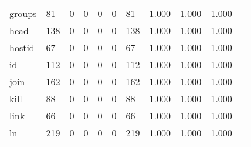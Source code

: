 \begin{longtable}{lp{1.10cm}p{1.10cm}p{1.10cm}p{1.10cm}p{1.10cm}p{1.10cm}p{1.10cm}p{1.10cm}p{1.10cm}p{1.10cm}}
groups    &                     81 &                                  0 &                                 0 &                                0 &                                 0 &                              81 &                          1.000 &                                 1.000 &                               1.000 \\
head      &                    138 &                                  0 &                                 0 &                                0 &                                 0 &                             138 &                          1.000 &                                 1.000 &                               1.000 \\
hostid    &                     67 &                                  0 &                                 0 &                                0 &                                 0 &                              67 &                          1.000 &                                 1.000 &                               1.000 \\
id        &                    112 &                                  0 &                                 0 &                                0 &                                 0 &                             112 &                          1.000 &                                 1.000 &                               1.000 \\
join      &                    162 &                                  0 &                                 0 &                                0 &                                 0 &                             162 &                          1.000 &                                 1.000 &                               1.000 \\
kill      &                     88 &                                  0 &                                 0 &                                0 &                                 0 &                              88 &                          1.000 &                                 1.000 &                               1.000 \\
link      &                     66 &                                  0 &                                 0 &                                0 &                                 0 &                              66 &                          1.000 &                                 1.000 &                               1.000 \\
ln        &                    219 &                                  0 &                                 0 &                                0 &                                 0 &                             219 &                          1.000 &                                 1.000 &                               1.000 \\

\end{longtable}
